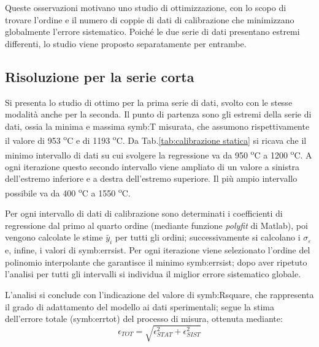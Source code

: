 Queste osservazioni motivano uno studio di ottimizzazione, con lo scopo di trovare l'ordine e il numero di coppie di dati di calibrazione che minimizzano globalmente l'errore sistematico. 
Poiché le due serie di dati presentano estremi differenti, lo studio viene proposto separatamente per entrambe.


\subsection{Risoluzione per la serie corta}
Si presenta lo studio di ottimo per la prima serie di dati, svolto con le stesse modalità anche per la seconda. Il punto di partenza sono gli estremi della serie di dati, ossia la minima e massima \gls{symb:T} misurata, che assumono rispettivamente il valore di 953 \textsuperscript{o}C e di 1193 \textsuperscript{o}C. Da Tab.\ref{tab:calibrazione statica} si ricava che il minimo intervallo di dati su cui svolgere la regressione va da 950 \textsuperscript{o}C a 1200 \textsuperscript{o}C. A ogni iterazione questo secondo intervallo viene ampliato di un valore a sinistra dell'estremo inferiore e a destra dell'estremo superiore. Il più ampio intervallo possibile va da 400 \textsuperscript{o}C a 1550 \textsuperscript{o}C. 

Per ogni intervallo di dati di calibrazione sono determinati i coefficienti di regressione dal primo al quarto ordine (mediante funzione \textit{polyfit} di Matlab), poi vengono calcolate le stime $\tilde{y_i}$ per tutti gli ordini; successivamente si calcolano i $\sigma_{\varepsilon}$ e, infine, i valori di \gls{symb:errsist}. Per ogni iterazione viene selezionato l'ordine del polinomio interpolante che garantisce il minimo \gls{symb:errsist}; dopo aver ripetuto l'analisi per tutti gli intervalli si individua il miglior errore sistematico globale. 

L'analisi si conclude con l'indicazione del valore di \gls{symb:Rsquare}, che rappresenta il grado di adattamento del modello ai dati sperimentali; segue la stima dell'errore totale (\gls{symb:errtot}) del processo di misura, ottenuta mediante: 
\begin{equation}
	\epsilon_{\textit{TOT}}=\sqrt{\epsilon_{\textit{STAT}}^2+\epsilon_{\textit{SIST}}^2}
\end{equation}

